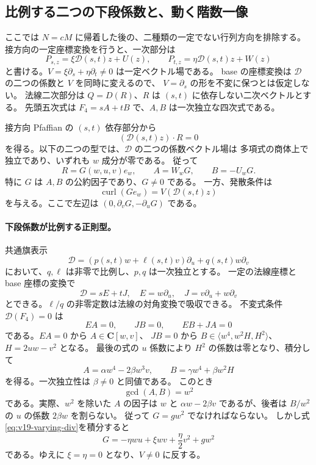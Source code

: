 \documentclass[11pt,a4paper]{ltjsarticle}
\theoremstyle{remark}\newtheorem{remark}[theorem]{注意}
\begin{document}
\subsection{比例する二つの下段係数と、動く階数一像}
\label{sec:v19-two-varying-pencils}

ここでは $N=cM$ に帰着した後の、二種類の一定でない行列方向を排除する。
接方向の一定座標変換を行うと、一次部分は
\[
 P_{s,z}=\xi\mathcal D(s,t)z+U(z),\qquad
 P_{t,z}=\eta\mathcal D(s,t)z+W(z)
\]
と書ける。$V=\xi\partial_s+\eta\partial_t\ne0$ は一定ベクトル場である。
base の座標変換は $\mathcal D$ の二つの係数と $V$ を同時に変えるので、
$V=\partial_s$ の形を不変に保つとは仮定しない。
法線二次部分は $Q=D(R)$、$R$ は $(s,t)$ に依存しない二次ベクトルとする。
先頭五次式は $F_4=sA+tB$ で、$A,B$ は一次独立な四次式である。

接方向 Pfaffian の $(s,t)$ 依存部分から
\[
 (\mathcal D(s,t)z)\cdot R=0
\]
を得る。以下の二つの型では、$\mathcal D$ の二つの係数ベクトル場は
多項式の商体上で独立であり、いずれも $w$ 成分が零である。
従って
\[
 R=G(w,u,v)e_w,\qquad
 A=W_wG,\qquad B=-U_wG.
\]
特に $G$ は $A,B$ の公約因子であり、$G\ne0$ である。
一方、発散条件は
\begin{equation}\label{eq:v19-varying-div}
 \operatorname{curl}(Ge_w)=V(\mathcal D(s,t)z)
\end{equation}
を与える。ここで左辺は $(0,\partial_vG,-\partial_uG)$ である。

\paragraph{下段係数が比例する正則型。}
共通旗表示
\[
 \mathcal D=(p(s,t)w+\ell(s,t)v)\partial_u+q(s,t)w\partial_v
\]
において、$q,\ell$ は非零で比例し、$p,q$ は一次独立とする。
一定の法線座標と base 座標の変換で
\[
 \mathcal D=sE+tJ,
 \quad E=w\partial_u,\quad J=v\partial_u+w\partial_v
\]
とできる。$\ell/q$ の非零定数は法線の対角変換で吸収できる。
不変式条件 $\mathcal D(F_4)=0$ は
\[
 EA=0,\qquad JB=0,\qquad EB+JA=0
\]
である。$EA=0$ から $A\in\mathbf C[w,v]$、
$JB=0$ から $B\in\langle w^4,w^2H,H^2\rangle$、$H=2uw-v^2$ となる。
最後の式の $u$ 係数により $H^2$ の係数は零となり、積分して
\begin{equation}\label{eq:v19-dep-ellq-invariants}
 A=\alpha w^4-2\beta w^3v,
 \qquad B=\gamma w^4+\beta w^2H
\end{equation}
を得る。一次独立性は $\beta\ne0$ と同値である。
このとき
\[
                        \gcd(A,B)=w^2
\]
である。実際、$w^2$ を除いた $A$ の因子は $w$ と
$\alpha w-2\beta v$ であるが、後者は $B/w^2$ の $u$ の係数
$2\beta w$ を割らない。
従って $G=gw^2$ でなければならない。
しかし式\eqref{eq:v19-varying-div}を積分すると
\[
 G=-\eta wu+\xi wv+\frac\eta2v^2+gw^2
\]
である。ゆえに $\xi=\eta=0$ となり、$V\ne0$ に反する。
\end{document}
